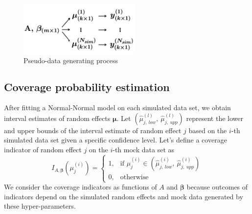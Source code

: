 \documentclass[article]{jss}
\begin{document}
\begin{figure}[h]
\begin{center}
\includegraphics[width=6cm]{process.png}
\caption{Pseudo-data generating process}
\label{fig:pseudo}
\end{center}
\end{figure}



\subsection{Coverage probability estimation}
After fitting a Normal-Normal model on each simulated data set, we obtain interval estimates of random effects $\boldsymbol{\mu}$. Let $(\hat{\mu}^{(l)}_{j, ~low}, ~\hat{\mu}^{(l)}_{j, ~upp})$ represent the lower and upper bounds of the interval estimate of random effect $j$ based on the $i$-th simulated data set given a specific confidence level.  Let's define a coverage indicator of random effect $j$ on the $i$-th mock data set as 
\begin{equation}\label{coverage_indicator}
I_{A, \boldsymbol{\beta}}(\mu_j^{(i)}) = \left\{ \begin{array}{ll}
1, & \textrm{if $\mu_j^{(i)}\in(\hat{\mu}^{(i)}_{j, ~low}, ~\hat{\mu}^{(i)}_{j, ~upp})$}\\
0, & \textrm{otherwise}
\end{array} \right.
\end{equation}
We consider the coverage indicators as functions of $A$ and $\boldsymbol{\beta}$ because outcomes of indicators depend on the simulated random effects and mock data generated by these hyper-parameters. 




\end{document}
